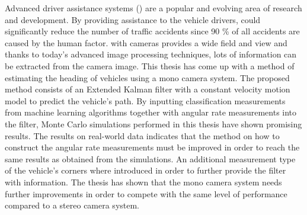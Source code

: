 Advanced driver assistance systems (\abbrADAS) are a popular and evolving area of research and development.
By providing assistance to the vehicle drivers, \abbrADAS could significantly reduce the number of traffic accidents since 90 \% of all accidents are caused by the human factor.
\abbrADAS with cameras provides a wide field and view and thanks to today's advanced image processing techniques, lots of information can be extracted from the camera image.
This thesis has come up with a method of estimating the heading of vehicles using a mono camera system.
The proposed method consists of an Extended Kalman filter with a constant velocity motion model to predict the vehicle's path.
By inputting classification measurements from machine learning algorithms together with angular rate measurements into the filter, Monte Carlo simulations performed in this thesis have shown promising results.
The results on real-world data indicates that the method on how to construct the angular rate measurements must be improved in order to reach the same results as obtained from the simulations.
An additional measurement type of the vehicle's corners where introduced in order to further provide the filter with information.
The thesis has shown that the mono camera system needs further improvements in order to compete with the same level of performance compared to a stereo camera system.